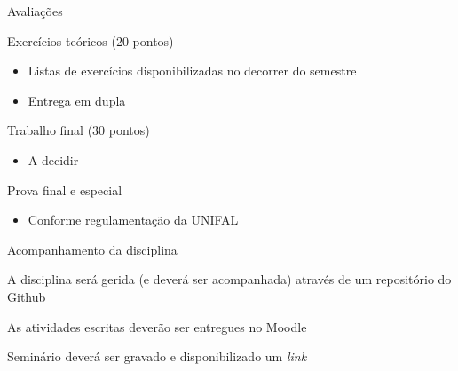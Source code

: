\documentclass[compress,mathserif]{beamer}
\begin{document}

\begin{frame}{Avaliações}

Exercícios teóricos (20 pontos)
\begin{itemize}
    \item Listas de exercícios disponibilizadas no decorrer do semestre
    \item Entrega em dupla
\end{itemize}

\vspace{0.5cm}

Trabalho final (30 pontos)
\begin{itemize}
    \item A decidir
\end{itemize}

\vspace{0.5cm}

Prova final e especial
\begin{itemize}
    \item Conforme regulamentação da UNIFAL
\end{itemize}
\end{frame}



\begin{frame}{Acompanhamento da disciplina}

A disciplina será gerida (e deverá ser acompanhada) através de um repositório do Github 
\href{https://github.com/iagoac/dce747/}{}

\vspace{0.5cm}

As atividades escritas deverão ser entregues no Moodle

\vspace{0.5cm}

Seminário deverá ser gravado e disponibilizado um \textit{link}

\end{frame}
\end{document}
